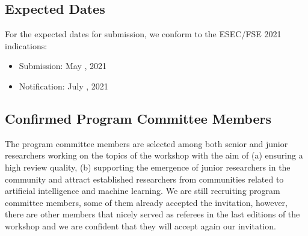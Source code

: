 \subsection{Expected Dates}

For the expected dates for submission, we conform to the ESEC/FSE 2021 indications:
\begin{itemize}[topsep=0.5em, itemsep=0.5em]
	\item Submission: May , 2021
	\item Notification: July , 2021
\end{itemize}


\subsection{Confirmed Program Committee Members}
The program committee members are selected among both senior and junior researchers working on the topics of the workshop with the aim of (a) ensuring a high review quality, (b) supporting the emergence of junior researchers in the community and attract established researchers from communities related to artificial intelligence and machine learning.
We are still recruiting program committee members, some of them already accepted the invitation, however, there are other members that nicely served as referees in the last editions of the workshop and we are confident that they will accept again our invitation.

